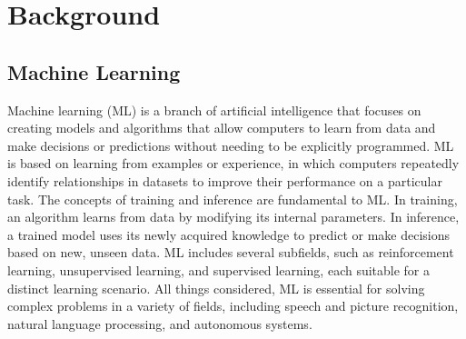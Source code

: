 \chapter{Background}
\section{Machine Learning}
    Machine learning (ML) is a branch of artificial intelligence that focuses on creating models and algorithms that allow computers to learn from data and make decisions or predictions without needing to be explicitly programmed. ML is based on learning from examples or experience, in which computers repeatedly identify relationships in datasets to improve their performance on a particular task. The concepts of training and inference are fundamental to ML. In training, an algorithm learns from data by modifying its internal parameters. In inference, a trained model uses its newly acquired knowledge to predict or make decisions based on new, unseen data. ML includes several subfields, such as reinforcement learning, unsupervised learning, and supervised learning, each suitable for a distinct learning scenario. All things considered, ML is essential for solving complex problems in a variety of fields, including speech and picture recognition, natural language processing, and autonomous systems.\clearpage
